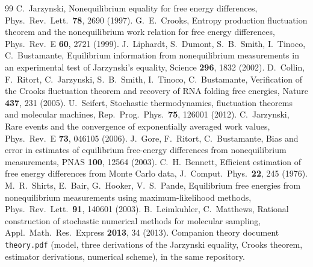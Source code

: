 \documentclass[11pt,a4paper]{article}
\begin{document}
\begin{thebibliography}{99}
 C.~Jarzynski, Nonequilibrium equality for free energy differences, Phys.\ Rev.\ Lett.\ \textbf{78}, 2690 (1997).
 G.~E.~Crooks, Entropy production fluctuation theorem and the nonequilibrium work relation for free
energy differences, Phys.\ Rev.\ E \textbf{60}, 2721 (1999).
 J.~Liphardt, S.~Dumont, S.~B.~Smith, I.~Tinoco, C.~Bustamante, Equilibrium information from
nonequilibrium measurements in an experimental test of Jarzynski's equality, Science \textbf{296}, 1832 (2002).
 D.~Collin, F.~Ritort, C.~Jarzynski, S.~B.~Smith, I.~Tinoco, C.~Bustamante, Verification of the Crooks
fluctuation theorem and recovery of RNA folding free energies, Nature \textbf{437}, 231 (2005).
 U.~Seifert, Stochastic thermodynamics, fluctuation theorems and molecular machines, Rep.\ Prog.\
Phys.\ \textbf{75}, 126001 (2012).
 C.~Jarzynski, Rare events and the convergence of exponentially averaged work values, Phys.\ Rev.\ E
\textbf{73}, 046105 (2006).
 J.~Gore, F.~Ritort, C.~Bustamante, Bias and error in estimates of equilibrium free-energy differences
from nonequilibrium measurements, PNAS \textbf{100}, 12564 (2003).
\bibitem{B76} C.~H.~Bennett, Efficient estimation of free energy differences from Monte Carlo data, J.\ Comput.\
Phys.\ \textbf{22}, 245 (1976).
\bibitem{S03} M.~R.~Shirts, E.~Bair, G.~Hooker, V.~S.~Pande, Equilibrium free energies from nonequilibrium
measurements using maximum-likelihood methods, Phys.\ Rev.\ Lett.\ \textbf{91}, 140601 (2003).
\bibitem{LM13} B.~Leimkuhler, C.~Matthews, Rational construction of stochastic numerical methods for molecular
sampling, Appl.\ Math.\ Res.\ Express \textbf{2013}, 34 (2013).
\bibitem{theory} Companion theory document \texttt{theory.pdf} (model, three derivations of the Jarzynski equality,
Crooks theorem, estimator derivations, numerical scheme), in the same repository.
\end{thebibliography}
\end{document}
